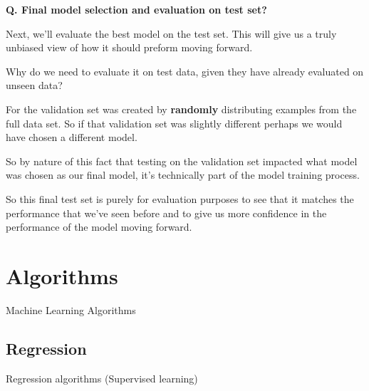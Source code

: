 \begin{frame}[fragile]{\textbf{Q. Final model selection and evaluation on test set?}}
  \begin{wideitemize}\small
    \item Next, we'll evaluate the best model on the test set. This will give us
    a truly unbiased view of how it should preform moving forward.
    \item Why do we need to evaluate it on test data, given they have already evaluated on unseen data?
    \medskip
    \begin{wideitemize}
      \item For the validation set was created by \textbf{randomly} distributing examples from
      the full data set. So if that validation set was slightly different perhaps we would
      have chosen a different model.
      \item So by nature of this fact that testing on the validation set impacted what model
      was chosen as our final model, it's technically part of the model training process.
      \item So this final test set is purely for evaluation purposes to see that it matches
      the performance that we've seen before and to give us more confidence in the performance
      of the model moving forward.
    \end{wideitemize}
  \end{wideitemize}
\end{frame}

\section{Algorithms}
\begin{transitionframe}
  \begin{center}
    \Huge Machine Learning Algorithms
  \end{center}
\end{transitionframe}

\subsection{Regression}
\begin{transitionsubframe}
  \begin{center}
    \Huge Regression algorithms (Supervised learning)
  \end{center}
\end{transitionsubframe}

